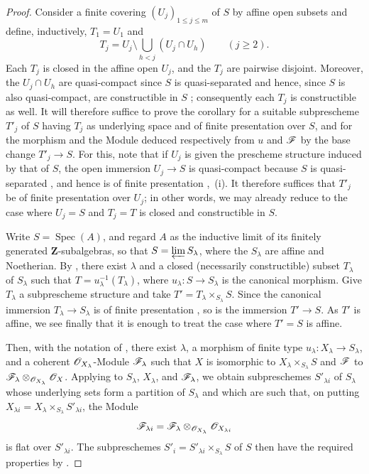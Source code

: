 \begin{proof}
Consider a finite covering $(U_j)_{1\leqslant j\leqslant m}$ of $S$ by affine open subsets and define, inductively, $T_1=U_1$ and
\[
T_j=U_j\setminus\bigcup_{h<j}(U_j\cap U_h)\qquad(j\geqslant 2).
\]
Each $T_j$ is closed in the affine open $U_j$, and the $T_j$ are pairwise disjoint.
Moreover, the $U_j\cap U_h$ are quasi-compact since $S$ is quasi-separated and hence, since $S$ is also quasi-compact, are constructible in $S$ ; consequently each $T_j$ is constructible as well.
It will therefore suffice to prove the corollary for a suitable subprescheme $T'_j$ of $S$ having $T_j$ as underlying space and of finite presentation over $S$, and for the morphism and the Module deduced respectively from $u$ and $\mathscr{F}$ by the base change $T'_j\to S$.
For this, note that if $U_j$ is given the prescheme structure induced by that of $S$, the open immersion $U_j\to S$ is quasi-compact because $S$ is quasi-separated , and hence is of
finite presentation ,~(i).
It therefore suffices that $T'_j$ be of finite presentation over $U_j$; in other words, we may already reduce to the case where $U_j=S$ and $T_j=T$ is closed and constructible in $S$.

Write $S=\operatorname{Spec}(A)$, and regard $A$ as the inductive limit of its finitely generated $\mathbf{Z}$-subalgebras, so that $S=\varprojlim S_\lambda$, where the $S_\lambda$ are affine and Noetherian.
By , there exist $\lambda$ and a closed (necessarily constructible) subset $T_\lambda$ of $S_\lambda$ such that $T=u_\lambda^{-1}(T_\lambda)$, where $u_\lambda:S\to S_\lambda$ is the canonical morphism.
Give $T_\lambda$ a subprescheme structure and take $T'=T_\lambda\times_{S_\lambda}S$.
Since the canonical immersion $T_\lambda\to S_\lambda$ is of finite presentation , so is the immersion $T'\to S$.
As $T'$ is affine, we see finally that it is enough to treat the case where $T'=S$ is affine.

Then, with the notation of , there exist $\lambda$, a morphism of finite type $u_\lambda:X_\lambda\to S_\lambda$, and a coherent $\mathscr{O}_{X_\lambda}$-Module $\mathscr{F}_\lambda$ such that $X$ is isomorphic to $X_\lambda\times_{S_\lambda}S$ and $\mathscr{F}$ to $\mathscr{F}_\lambda\otimes_{\mathscr{O}_{X_\lambda}}\mathscr{O}_X$.
Applying  to $S_\lambda$, $X_\lambda$, and $\mathscr{F}_\lambda$, we obtain subpreschemes $S'_{\lambda i}$ of $S_\lambda$ whose underlying sets form a partition of $S_\lambda$ and which are such that, on putting $X_{\lambda i}=X_\lambda\times_{S_\lambda}S'_{\lambda i}$, the Module
\[
\mathscr{F}_{\lambda i}=\mathscr{F}_\lambda\otimes_{\mathscr{O}_{X_\lambda}}\mathscr{O}_{X_{\lambda i}}
\]
is flat over $S'_{\lambda i}$.
The subpreschemes $S'_i=S'_{\lambda i}\times_{S_\lambda}S$ of $S$ then have the required properties by .
\end{proof}

